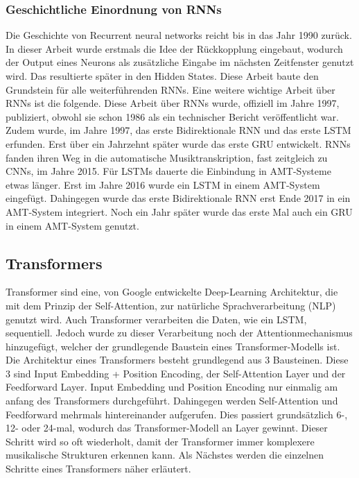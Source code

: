 \subsubsection*{Geschichtliche Einordnung von RNNs}
Die Geschichte von Recurrent neural networks reicht bis in das Jahr 1990 zurück.
\cite{elman1990finding}
In dieser Arbeit wurde erstmals die Idee der Rückkopplung eingebaut,
wodurch der Output eines Neurons als zusätzliche Eingabe im nächsten Zeitfenster genutzt wird.
Das resultierte später in den Hidden States.
Diese Arbeit baute den Grundstein für alle weiterführenden RNNs.
Eine weitere wichtige Arbeit über RNNs ist die folgende.
\cite{jordan1997serial}
Diese Arbeit über RNNs wurde, offiziell im Jahre 1997, publiziert,
obwohl sie schon 1986 als ein technischer Bericht veröffentlicht war.
Zudem wurde, im Jahre 1997, das erste Bidirektionale RNN
\cite{schuster1997bidirectional}
und das erste LSTM erfunden.
\cite{hochreiter1997long}
Erst über ein Jahrzehnt später wurde das erste GRU entwickelt.
\cite{chung2014empirical}
RNNs fanden ihren Weg in die automatische Musiktranskription, fast zeitgleich zu CNNs, im Jahre 2015.
\cite{sigtia2015hybrid}
Für LSTMs dauerte die Einbindung in AMT-Systeme etwas länger.
Erst im Jahre 2016 wurde ein LSTM in einem AMT-System eingefügt.
\cite{sigtia2016end}
Dahingegen wurde das erste Bidirektionale RNN erst Ende 2017 in ein AMT-System integriert.
\cite{hawthorne2017onsets}
Noch ein Jahr später wurde das erste Mal auch ein GRU in einem AMT-System genutzt.
\cite{jung2018adaptive}

\subsection{Transformers}
Transformer sind eine, von Google entwickelte Deep-Learning Architektur,
die mit dem Prinzip der Self-Attention, zur natürliche Sprachverarbeitung (NLP) genutzt wird.
Auch Transformer verarbeiten die Daten, wie ein LSTM, sequentiell.
Jedoch wurde zu dieser Verarbeitung noch der Attentionmechanismus hinzugefügt,
welcher der grundlegende Baustein eines Transformer-Modells ist.
Die Architektur eines Transformers besteht grundlegend aus 3 Bausteinen.
Diese 3 sind Input Embedding + Position Encoding, der Self-Attention Layer und der Feedforward Layer.
Input Embedding und Position Encoding nur einmalig am anfang des Transformers durchgeführt.
Dahingegen werden Self-Attention und Feedforward mehrmals hintereinander aufgerufen.
Dies passiert grundsätzlich 6-, 12- oder 24-mal, wodurch das Transformer-Modell an Layer gewinnt.
Dieser Schritt wird so oft wiederholt, damit der Transformer immer komplexere musikalische Strukturen erkennen kann.
Als Nächstes werden die einzelnen Schritte eines Transformers näher erläutert.

